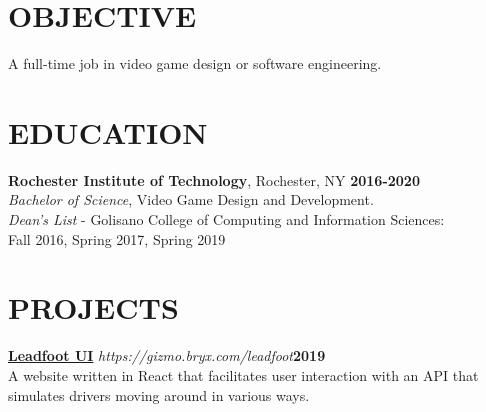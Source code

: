 \documentclass[line,margin]{res}
\begin{document}
\begin{resume}

\section{OBJECTIVE}
A full-time job in video game design or software engineering.



\section{EDUCATION}
\textbf{Rochester Institute of Technology}, Rochester, NY\hfill
    \textbf{2016-2020}\\
{\sl Bachelor of Science}, Video Game Design and Development.
\\
{\sl Dean's List} - Golisano College of Computing and Information Sciences:\hfill \\ Fall 2016, Spring 2017, Spring 2019
\section{PROJECTS}
\par
    \href{https://gizmo.bryx.com/leadfoot}{\textbf{Leadfoot UI}}
    {\sl https://gizmo.bryx.com/leadfoot}\hfill \textbf{2019}\\ 
    A website written in React that facilitates user interaction with an API that simulates drivers moving around in various ways.
	

\end{resume}
\end{document}
